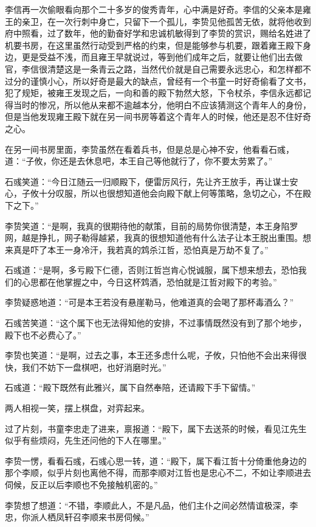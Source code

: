 李信再一次偷眼看向那个二十多岁的俊秀青年，心中满是好奇。李信的父亲本是雍王的亲卫，在一次行刺中身亡，只留下一个孤儿，李贽见他孤苦无依，就将他收到府中照看，过了数年，他的勤奋好学和忠诚机敏得到了李贽的赏识，赐给名姓进了机要书房，在这里虽然行动受到严格的约束，但是能够参与机要，跟着雍王殿下身边，更是受益不浅，而且雍王早就说过，等到他们成年之后，就要让他们出去做官，李信很清楚这是一条青云之路，当然代价就是自己需要永远忠心，和怎样都不过分的谨慎小心，所以好奇是最大的缺点，曾经有一个书童一时好奇偷看了文书，犯了规矩，被雍王发现之后，一向和善的殿下勃然大怒，下令杖杀，李信永远都记得当时的惨况，所以他从来都不逾越本分，他明白不应该猜测这个青年人的身份，但是当他发现雍王殿下就在另一间书房等着这个青年人的时候，他还是忍不住好奇之心。

在另一间书房里面，李贽虽然在看着兵书，但是总是心神不安，他看看石彧，道：“子攸，你还是去休息吧，本王自己等他就行了，你不要太劳累了。”

石彧笑道：“今日江随云一归顺殿下，便雷厉风行，先让齐王放手，再让谋士安心，子攸十分叹服，所以也很想知道他会向殿下献上何等策略，急切之心，不在殿下之下。”

李贽笑道：“是啊，我真的很期待他的献策，目前的局势你很清楚，本王身陷罗网，越是挣扎，网子勒得越紧，我真的很想知道他有什么法子让本王脱出重围。想来真是吓了本王一身冷汗，我若真的鸩杀江哲，恐怕真是万劫不复了。”

石彧道：“是啊，多亏殿下仁德，否则江哲岂肯心悦诚服，属下想来想去，恐怕我们的心思都在他掌握之中，今日这杯鸩酒，恐怕就是江哲对殿下的考验。”

李贽疑惑地道：“可是本王若没有悬崖勒马，他难道真的会喝了那杯毒酒么？”

石彧苦笑道：“这个属下也无法得知他的安排，不过事情既然没有到了那个地步，殿下也不必费心了。”

李贽也笑道：“是啊，过去之事，本王还多虑什么呢，子攸，只怕他不会出来得很快，我们不妨下一盘棋吧，也好消磨时光。”

石彧道：“殿下既然有此雅兴，属下自然奉陪，还请殿下手下留情。”

两人相视一笑，摆上棋盘，对弈起来。

过了片刻，书童李忠走了进来，禀报道：“殿下，属下去送茶的时候，看见江先生似乎有些烦闷，先生还问他的下人在哪里。”

李贽一愣，看看石彧，石彧心思一转，道：“殿下，属下看江哲十分倚重他身边的那个李顺，似乎片刻也离他不得，而那李顺对江哲也是忠心不二，不如让李顺进去伺候，反正以后李顺也不免接触机密的。”

李贽想了想道：“不错，李顺此人，不是凡品，他们主仆之间必然情谊极深，李忠，你派人栖凤轩召李顺来书房伺候。”


